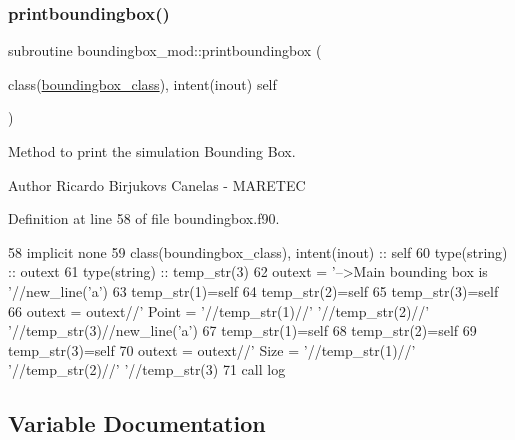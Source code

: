 \subsubsection{\texorpdfstring{printboundingbox()}{printboundingbox()}}
{\footnotesize\ttfamily subroutine boundingbox\+\_\+mod\+::printboundingbox (\begin{DoxyParamCaption}\item[{class(\mbox{\hyperlink{structboundingbox__mod_1_1boundingbox__class}{boundingbox\+\_\+class}}), intent(inout)}]{self }\end{DoxyParamCaption})\hspace{0.3cm}{\ttfamily [private]}}



Method to print the simulation Bounding Box. 

\begin{DoxyAuthor}{Author}
Ricardo Birjukovs Canelas -\/ M\+A\+R\+E\+T\+EC 
\end{DoxyAuthor}


Definition at line 58 of file boundingbox.\+f90.


\begin{DoxyCode}
58     \textcolor{keywordtype}{implicit none}
59     \textcolor{keywordtype}{class}(boundingbox\_class), \textcolor{keywordtype}{intent(inout)} :: self
60     \textcolor{keywordtype}{type}(string) :: outext
61     \textcolor{keywordtype}{type}(string) :: temp\_str(3)
62     outext = \textcolor{stringliteral}{'-->Main bounding box is '}//new\_line(\textcolor{stringliteral}{'a'})
63     temp\_str(1)=self%
64     temp\_str(2)=self%
65     temp\_str(3)=self%
66     outext = outext//\textcolor{stringliteral}{'       Point = '}//temp\_str(1)//\textcolor{stringliteral}{' '}//temp\_str(2)//\textcolor{stringliteral}{' '}//temp\_str(3)//new\_line(\textcolor{stringliteral}{'a'})
67     temp\_str(1)=self%
68     temp\_str(2)=self%
69     temp\_str(3)=self%
70     outext = outext//\textcolor{stringliteral}{'       Size = '}//temp\_str(1)//\textcolor{stringliteral}{' '}//temp\_str(2)//\textcolor{stringliteral}{' '}//temp\_str(3)
71     \textcolor{keyword}{call }log%
\end{DoxyCode}


\subsection{Variable Documentation}
\mbox{\label{namespaceboundingbox__mod_a45e98e492bb546328c98f618a74622ec}} 
